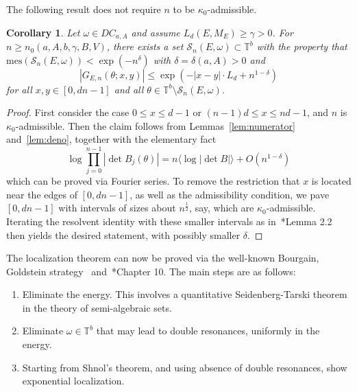 \documentclass[11pt]{amsart}
\newtheorem{corollary}[theorem]{Corollary}
\def\mes{\mathrm{mes}}
\def\tor{\mathbb{T}}
\def\calS{\mathcal{S}}
\begin{document}
The following result does not require $n$ to be  $\kappa_0$-admissible. 
\begin{corollary}
    \label{cor:goodGreen}
    Let $\omega\in DC_{a,A}$ and assume $L_d(E,M_E)\geq \gamma>0$. For $n\ge n_0(a,A,b, \gamma, B,V)$, 
    there exists a set $\calS_n(E,\omega)\subset\tor^b$ with the property that $\mes(\calS_n(E,\omega))<\exp(-n^\delta)$ with $\delta=\delta(a,A)>0$ and 
    \begin{equation}
        \label{eq:GregE}
        |G_{E,n}(\theta;x,y)|\le \exp(-|x-y|\cdot L_d+n^{1-\delta})
    \end{equation}
    for all $x,y\in [0,dn-1]$  and all $\theta\in\tor^b\setminus\calS_n(E,\omega)$. 
\end{corollary}
\begin{proof}
First consider the case  $0\le x \le d-1$ or $(n-1)d\leq x\leq nd-1$, and $n$ is $\kappa_0$-admissible. 
    Then the claim follows from Lemmas~\ref{lem:numerator} and~\ref{lem:deno}, together with the elementary fact
    \[
    \log \prod_{j=0}^{n-1}|\det B_j(\theta)| = n \langle \log |\det B|\rangle + O(n^{1-\delta})
    \]
    which can be proved via Fourier series. To remove the restriction that $x$ is located near the edges of $[0,dn-1]$, as well as the admissibility condition, we pave $[0,dn-1]$ with intervals of sizes about $n^{\frac12
    }$, say, which are $\kappa_0$-admissible. Iterating the resolvent identity with these smaller intervals as in~\cite{BGS}*{Lemma 2.2} then yields the desired statement, with possibly smaller $\delta$. 
\end{proof}

The localization theorem can now be proved via the well-known Bourgain, Goldstein strategy~\cite{BG} and~\cite{B}*{Chapter 10}. The main steps are as follows:

\begin{enumerate}
    \item[(a)] Eliminate the energy. This involves a quantitative Seidenberg-Tarski theorem in the theory of semi-algebraic sets. 
    \item[(b)] Eliminate $\omega\in\tor^b$ that may lead to double resonances, uniformly in the energy. 
    \item[(c)]  Starting from Shnol's theorem, and using absence of double resonances, show exponential localization. 
\end{enumerate}
\end{document}
